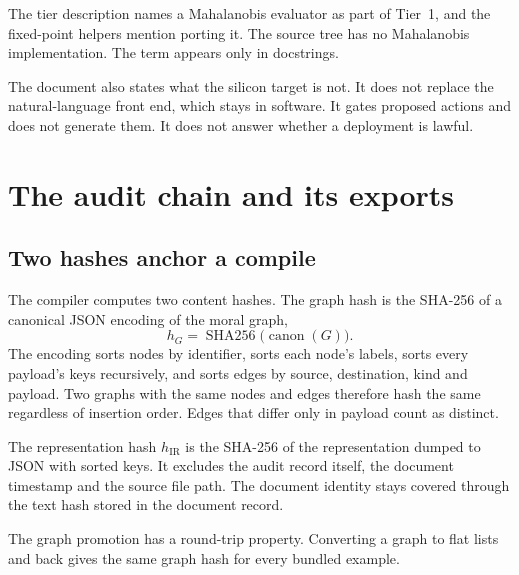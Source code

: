 
The tier description names a Mahalanobis evaluator as part of Tier~1, and the fixed-point helpers
mention porting it. The source tree has no Mahalanobis implementation. The term appears only in
docstrings.

The document also states what the silicon target is not. It does not replace the
natural-language front end, which stays in software. It gates proposed actions and does not
generate them. It does not answer whether a deployment is lawful.

\section{The audit chain and its exports}\label{sec:compiler-audit}

\subsection{Two hashes anchor a compile}

The compiler computes two content hashes. The graph hash is the SHA-256 of a canonical JSON
encoding of the moral graph,
\begin{equation}
h_G = \operatorname{SHA256}\bigl(\operatorname{canon}(G)\bigr).
\label{eq:compiler-graphhash}
\end{equation}
The encoding sorts nodes by identifier, sorts each node's labels, sorts every payload's keys
recursively, and sorts edges by source, destination, kind and payload. Two graphs with the same
nodes and edges therefore hash the same regardless of insertion order. Edges that differ only in
payload count as distinct.

The representation hash $h_{\mathrm{IR}}$ is the SHA-256 of the representation dumped to JSON
with sorted keys. It excludes the audit record itself, the document timestamp and the source file
path. The document identity stays covered through the text hash stored in the document record.

The graph promotion has a round-trip property. Converting a graph to flat lists and back gives
the same graph hash for every bundled example.

